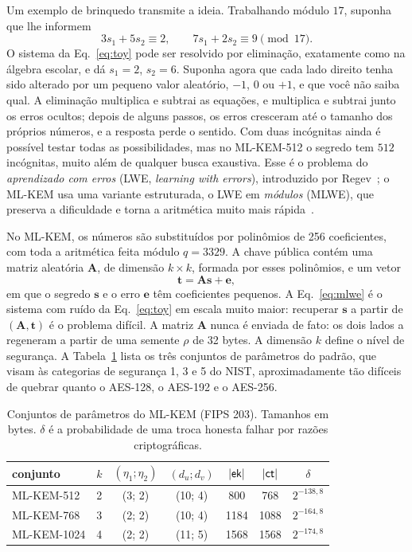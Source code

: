 Um exemplo de brinquedo transmite a ideia. Trabalhando módulo $17$, suponha
que lhe informem
\begin{equation}
3s_1 + 5s_2 \equiv 2, \qquad 7s_1 + 2s_2 \equiv 9 \pmod{17}.
\label{eq:toy}
\end{equation}
O sistema da Eq.~\eqref{eq:toy} pode ser resolvido por eliminação, exatamente
como na álgebra escolar, e dá $s_1=2$, $s_2=6$. Suponha agora que cada lado
direito tenha sido alterado por um pequeno valor aleatório, $-1$, $0$ ou $+1$,
e que você não saiba qual. A eliminação multiplica e subtrai as equações, e
multiplica e subtrai junto os erros ocultos; depois de alguns passos, os erros
cresceram até o tamanho dos próprios números, e a resposta perde o sentido. Com
duas incógnitas ainda é possível testar todas as possibilidades, mas no
ML-KEM-512 o segredo tem $512$ incógnitas, muito além de qualquer busca
exaustiva. Esse é o problema do \emph{aprendizado com erros} (LWE,
\emph{learning with errors}), introduzido por Regev~\cite{regev2009lwe}; o
ML-KEM usa uma variante estruturada, o LWE em \emph{módulos} (MLWE), que
preserva a dificuldade e torna a aritmética muito mais
rápida~\cite{langlois2015mlwe}.

No ML-KEM, os números são substituídos por polinômios de 256 coeficientes, com
toda a aritmética feita módulo $q=3329$. A chave pública contém uma matriz
aleatória $\mathbf{A}$, de dimensão $k\times k$, formada por esses polinômios,
e um vetor~\cite{fips203}
\begin{equation}
\mathbf{t} = \mathbf{A}\mathbf{s} + \mathbf{e},
\label{eq:mlwe}
\end{equation}
em que o segredo $\mathbf{s}$ e o erro $\mathbf{e}$ têm coeficientes pequenos.
A Eq.~\eqref{eq:mlwe} é o sistema com ruído da Eq.~\eqref{eq:toy} em escala
muito maior: recuperar $\mathbf{s}$ a partir de $(\mathbf{A},\mathbf{t})$ é o
problema difícil. A matriz $\mathbf{A}$ nunca é enviada de fato: os dois lados
a regeneram a partir de uma semente $\rho$ de 32 bytes. A dimensão $k$ define o
nível de segurança. A Tabela~\ref{tab:mlkem} lista os três conjuntos de
parâmetros do padrão, que visam às categorias de segurança 1, 3 e 5 do NIST,
aproximadamente tão difíceis de quebrar quanto o AES-128, o AES-192 e o
AES-256.

\begin{table}[!htb]
\caption{Conjuntos de parâmetros do ML-KEM (FIPS 203). Tamanhos em bytes.
$\delta$ é a probabilidade de uma troca honesta falhar por razões
criptográficas.}
\label{tab:mlkem}
\centering
\small
\begin{tabular}{lcccccc}
\toprule
conjunto & $k$ & $(\eta_1;\eta_2)$ & $(d_u;d_v)$ & $|\mathsf{ek}|$ & $|\mathsf{ct}|$ & $\delta$\\
\midrule
ML-KEM-512  & 2 & (3; 2) & (10; 4) & \phantom{1}800  & \phantom{1}768  & $2^{-138{,}8}$\\
ML-KEM-768  & 3 & (2; 2) & (10; 4) & 1184 & 1088 & $2^{-164{,}8}$\\
ML-KEM-1024 & 4 & (2; 2) & (11; 5) & 1568 & 1568 & $2^{-174{,}8}$\\
\bottomrule
\end{tabular}
\end{table}


